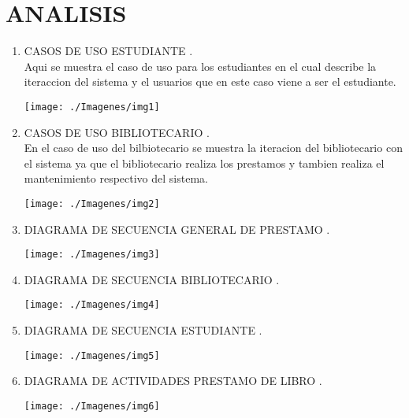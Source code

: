 \section{ANALISIS} 

\begin{enumerate}[1.]
	\item CASOS DE USO ESTUDIANTE .\\
		Aqui se muestra el caso de uso para los estudiantes en el cual describe la iteraccion del sistema y el usuarios que en 			este caso viene a ser el estudiante.
	\begin{center}
	
	\texttt{[image: ./Imagenes/img1]} 
	\end{center}
	\item CASOS DE USO BIBLIOTECARIO .\\
		En el caso de uso del bilbiotecario se muestra la iteracion del bibliotecario con el sistema ya que el bibliotecario 	realiza los prestamos y tambien realiza el mantenimiento respectivo del sistema.
	\begin{center}
	\texttt{[image: ./Imagenes/img2]} 
	\end{center}
\newpage
   	 \item DIAGRAMA DE SECUENCIA GENERAL DE PRESTAMO .\\
	\begin{center}
	\texttt{[image: ./Imagenes/img3]} 
	\end{center}
	
\newpage
	\item DIAGRAMA DE SECUENCIA BIBLIOTECARIO .\\
	\begin{center}
	\texttt{[image: ./Imagenes/img4]} 
	\end{center}

\newpage
	\item DIAGRAMA DE SECUENCIA ESTUDIANTE .\\
	\begin{center}
	\texttt{[image: ./Imagenes/img5]} 
	\end{center}
	\newpage
\item DIAGRAMA DE ACTIVIDADES PRESTAMO DE LIBRO .\\
	\begin{center}
	\texttt{[image: ./Imagenes/img6]} 
	\end{center}
\end{enumerate} 
